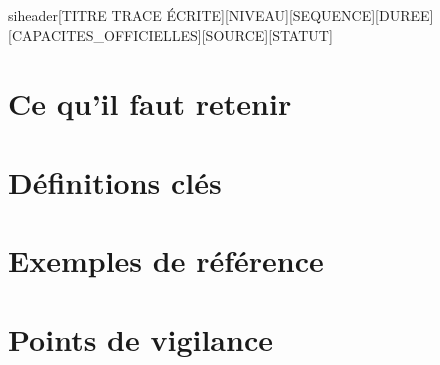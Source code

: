 \documentclass[a4paper,11pt]{article}
\begin{document}
siheader{[TITRE TRACE ÉCRITE]}{[NIVEAU]}{[SEQUENCE]}{[DUREE]}{[CAPACITES\_OFFICIELLES]}{[SOURCE]}{[STATUT]}
\section*{Ce qu'il faut retenir}
\section*{Définitions clés}
\section*{Exemples de référence}
\section*{Points de vigilance}
\end{document}
